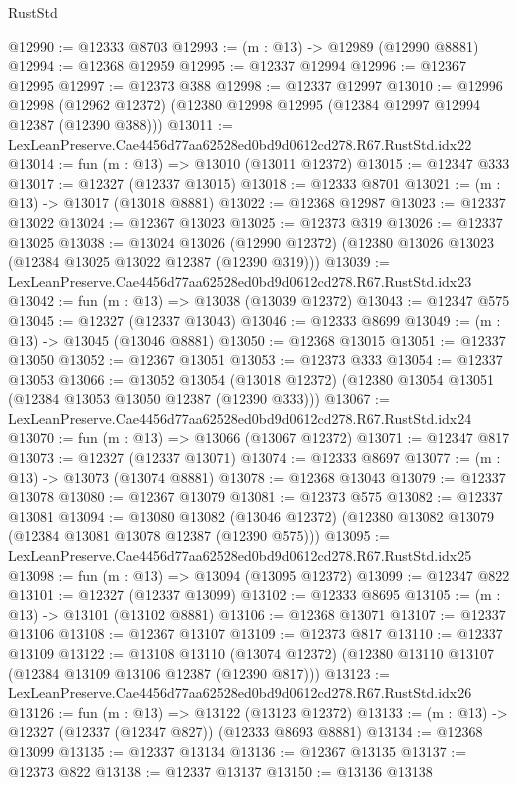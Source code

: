 \begin{lexlean}{RustStd}
\begin{coremodule}
@12990 := @12333 @8703
@12993 := (m : @13) -> @12989 (@12990 @8881)
@12994 := @12368 @12959
@12995 := @12337 @12994
@12996 := @12367 @12995
@12997 := @12373 @388
@12998 := @12337 @12997
@13010 := @12996
    @12998
    (@12962 @12372)
    (@12380 @12998 @12995 (@12384 @12997 @12994 @12387 (@12390 @388)))
@13011 := LexLeanPreserve.Cae4456d77aa62528ed0bd9d0612cd278.R67.RustStd.idx22
@13014 := fun (m : @13) => @13010 (@13011 @12372)
@13015 := @12347 @333
@13017 := @12327 (@12337 @13015)
@13018 := @12333 @8701
@13021 := (m : @13) -> @13017 (@13018 @8881)
@13022 := @12368 @12987
@13023 := @12337 @13022
@13024 := @12367 @13023
@13025 := @12373 @319
@13026 := @12337 @13025
@13038 := @13024
    @13026
    (@12990 @12372)
    (@12380 @13026 @13023 (@12384 @13025 @13022 @12387 (@12390 @319)))
@13039 := LexLeanPreserve.Cae4456d77aa62528ed0bd9d0612cd278.R67.RustStd.idx23
@13042 := fun (m : @13) => @13038 (@13039 @12372)
@13043 := @12347 @575
@13045 := @12327 (@12337 @13043)
@13046 := @12333 @8699
@13049 := (m : @13) -> @13045 (@13046 @8881)
@13050 := @12368 @13015
@13051 := @12337 @13050
@13052 := @12367 @13051
@13053 := @12373 @333
@13054 := @12337 @13053
@13066 := @13052
    @13054
    (@13018 @12372)
    (@12380 @13054 @13051 (@12384 @13053 @13050 @12387 (@12390 @333)))
@13067 := LexLeanPreserve.Cae4456d77aa62528ed0bd9d0612cd278.R67.RustStd.idx24
@13070 := fun (m : @13) => @13066 (@13067 @12372)
@13071 := @12347 @817
@13073 := @12327 (@12337 @13071)
@13074 := @12333 @8697
@13077 := (m : @13) -> @13073 (@13074 @8881)
@13078 := @12368 @13043
@13079 := @12337 @13078
@13080 := @12367 @13079
@13081 := @12373 @575
@13082 := @12337 @13081
@13094 := @13080
    @13082
    (@13046 @12372)
    (@12380 @13082 @13079 (@12384 @13081 @13078 @12387 (@12390 @575)))
@13095 := LexLeanPreserve.Cae4456d77aa62528ed0bd9d0612cd278.R67.RustStd.idx25
@13098 := fun (m : @13) => @13094 (@13095 @12372)
@13099 := @12347 @822
@13101 := @12327 (@12337 @13099)
@13102 := @12333 @8695
@13105 := (m : @13) -> @13101 (@13102 @8881)
@13106 := @12368 @13071
@13107 := @12337 @13106
@13108 := @12367 @13107
@13109 := @12373 @817
@13110 := @12337 @13109
@13122 := @13108
    @13110
    (@13074 @12372)
    (@12380 @13110 @13107 (@12384 @13109 @13106 @12387 (@12390 @817)))
@13123 := LexLeanPreserve.Cae4456d77aa62528ed0bd9d0612cd278.R67.RustStd.idx26
@13126 := fun (m : @13) => @13122 (@13123 @12372)
@13133 := (m : @13) -> @12327 (@12337 (@12347 @827)) (@12333 @8693 @8881)
@13134 := @12368 @13099
@13135 := @12337 @13134
@13136 := @12367 @13135
@13137 := @12373 @822
@13138 := @12337 @13137
@13150 := @13136
    @13138

\end{coremodule}
\end{lexlean}

